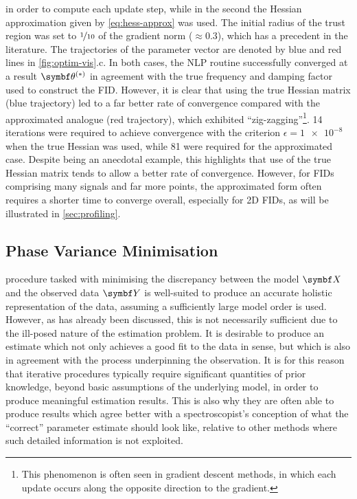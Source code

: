 in order to compute each update step, while in the second the Hessian
approximation given by \cref{eq:hess-approx} was used. The initial
radius of the trust region was set to $\nicefrac{1}{10}$ of the gradient norm
($\approx 0.3$), which has a precedent in the literature\cite{Gould2005}. The
trajectories of the parameter vector are denoted by blue and red lines in
\cref{fig:optim-vis}.c.
In both cases, the \ac{NLP} routine successfully converged at a result $\bthstar$
in agreement with the true frequency and damping factor used to construct the
\ac{FID}. However, it is clear that using the true Hessian matrix (blue trajectory)
led to a far better rate of convergence compared with the
approximated analogue (red trajectory), which exhibited ``zig-zagging''\footnote{
    This phenomenon is often seen in gradient descent methods, in which each
    update occurs along the opposite direction to the gradient.
}.
14 iterations were required to achieve convergence with the
criterion $\epsilon = \num[print-unity-mantissa=false]{1e-8}$
when the true Hessian was used, while 81 were required for the approximated
case. Despite being an anecdotal example, this highlights that use of the true
Hessian matrix tends to allow a better rate of convergence. However, for
\acp{FID} comprising many signals and far more points, the approximated form
often requires a shorter time to converge overall, especially for \ac{2D}
\acp{FID}, as will be illustrated in \cref{sec:profiling}.

\subsection{Phase Variance Minimisation}
\label{subsec:phase-variance}
 procedure tasked with minimising the discrepancy between the model
$\bX$ and the observed data $\bY$ is well-suited to produce an accurate
holistic
representation of the data, assuming a sufficiently large
model order is used. However, as has already been discussed, this is not
necessarily sufficient due to the ill-posed nature of the estimation problem.
It is desirable to produce an estimate which not only achieves a good fit to
the data in  sense, but which is also in agreement with the process
underpinning the observation. It is for this reason that iterative procedures
typically require significant quantities of prior knowledge, beyond basic
assumptions of the underlying model, in order to produce meaningful estimation
results.  This is also why they are often able to produce results which agree
better with a spectroscopist's conception of what the ``correct'' parameter
estimate should look like, relative to other methods where such detailed
information is not exploited.

